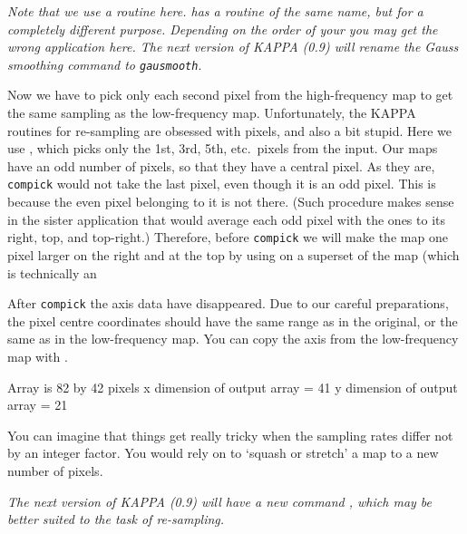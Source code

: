 \documentclass[11pt,noabs]{starlink}
\begin{document}
   \textit{Note that we use a
   routine here.
   has a routine of the same name, but for a completely different
   purpose. Depending on the order of your
   you may get the wrong application here.
   The next version of KAPPA (0.9) will rename the Gauss smoothing
   command to\/ \tt gausmooth}.

   Now we have to pick only each second pixel from the high-frequency
   map to get the same sampling as the low-frequency map. Unfortunately,
   the KAPPA routines for re-sampling are obsessed with pixels, and also
   a bit stupid. Here we use
\texttt{},
   which picks only
   the 1st, 3rd, 5th, etc.\ pixels from the input. Our maps have an
   odd number of pixels, so that they have a central pixel. As they are,
   \texttt{compick} would not take the last pixel, even though it is an
   odd pixel. This is because the even pixel belonging to it is
   not there. (Such procedure makes sense in the sister application
\texttt{}
   that would average each odd pixel with the ones to
   its right, top, and top-right.)
   Therefore, before \texttt{compick} we
   will make the map one pixel larger on the right and at the top by
   using
\texttt{}
   on a superset of the map (which is technically an

   After \texttt{compick} the axis data have disappeared. Due to our
   careful preparations, the pixel centre coordinates should have the
   same range as in the original, or the same as in the low-frequency
   map. You can copy the axis from the low-frequency map with
\texttt{}.

\begin{terminalv}
Array is 82 by 42 pixels
x dimension of output array  =  41
y dimension of output array  =  21
\end{terminalv}

   You can imagine that things get really tricky when the sampling rates
   differ not by an integer factor. You would rely on
\texttt{}
   to `squash or stretch' a map to a new number of pixels.

   \textit{The next version of KAPPA (0.9) will have a new command\/
\texttt{},
   which may be better suited to the task of re-sampling.}
\end{document}
